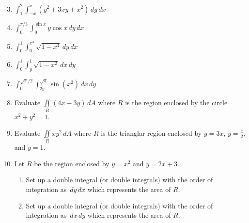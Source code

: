 \documentclass[12pt]{article}
\newif\ifans
\begin{document}
\begin{enumerate}
\setcounter{enumi}{2}
\item $\int_1^2 \int_{-x}^x \left(y^2+3xy+x^2\right) \,dy \,dx$

\ifans{\fbox{10}} \fi

\item $\int_0^{\pi/3} \int_0^{\sin{x}} y\cos{x}\,dy\,dx$

\ifans{\fbox{$\frac{\sqrt{3}}{16}$}} \fi

\item $\int_0^1 \int_0^{x^3} \sqrt{1-x^4} \,dy \,dx$

\ifans{\fbox{$\frac{1}{6}$}} \fi

\item $\int_0^1 \int_y^1 \sqrt{1-x^2} \,dx \,dy$

\ifans{\fbox{$\frac{1}{3}$}} \fi

\item $\int_0^{\sqrt{\pi}/2} \int_{2y}^{\sqrt{\pi}} \sin{\left(x^2\right)}\,dx \,dy$

\ifans{\fbox{$\frac{1}{2}$}} \fi

\item Evaluate $\iint \limits_{R} \left(4x-3y\right) \,dA$ where $R$ is the region enclosed by the circle $x^2+y^2=1$.

\ifans{\fbox{0}} \fi

\item Evaluate $\iint \limits_{R} xy^2 \,dA$ where $R$ is the trianglar region enclosed by $y=3x$, $y=\frac{x}{2}$, and $y=1$.

\ifans{\fbox{$\frac{7}{18}$}} \fi

\item Let $R$ be the region enclosed by $y=x^2$ and $y=2x+3$.

\begin{enumerate}

\item Set up a double integral (or double integrals) with the order of integration as $\,dy\,dx$ which represents the area of $R$.

\ifans{\fbox{$\int_{-1}^3 \int_{x^2}^{2x+3} 1 \,dy\,dx$}} \fi

\item Set up a double integral (or double integrals) with the order of integration as $\,dx\,dy$ which represents the area of $R$.

\ifans{\fbox{$\int_{0}^1 \int_{-\sqrt{y}}^{\sqrt{y}} 1 \,dx\,dy+\int_1^9 \int_{\frac{1}{2}y-\frac{3}{2}}^{\sqrt{y}} 1 \,dx\,dy$}} \fi


\end{enumerate}
\end{enumerate}
\end{document}

